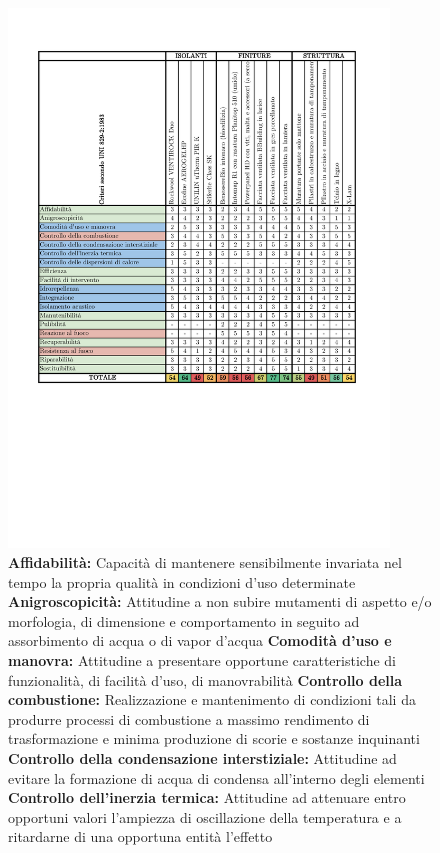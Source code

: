 \begin{figure}[p]
    \centering 
    \includegraphics[width=0.9\textwidth]{img/AnalisiValore.pdf}
    \caption[Analisi del valore]{%
\scriptsize
\textbf{Affidabilità:} Capacità di mantenere sensibilmente invariata nel tempo la propria qualità in condizioni d'uso determinate
\textbf{Anigroscopicità:} Attitudine a non subire mutamenti di aspetto e/o morfologia, di dimensione e comportamento in seguito ad assorbimento di acqua o di vapor d'acqua
\textbf{Comodità d'uso e manovra:} Attitudine a presentare opportune caratteristiche di funzionalità, di facilità d'uso, di manovrabilità
\textbf{Controllo della combustione:} Realizzazione e mantenimento di condizioni tali da produrre processi di combustione a massimo rendimento di trasformazione e minima produzione di scorie e sostanze inquinanti
\textbf{Controllo della condensazione interstiziale:} Attitudine ad evitare la formazione di acqua di condensa all'interno degli elementi
\textbf{Controllo dell'inerzia termica:} Attitudine ad attenuare entro opportuni valori l'ampiezza di oscillazione della temperatura e a ritardarne di una opportuna entità l'effetto
}
\end{figure}
